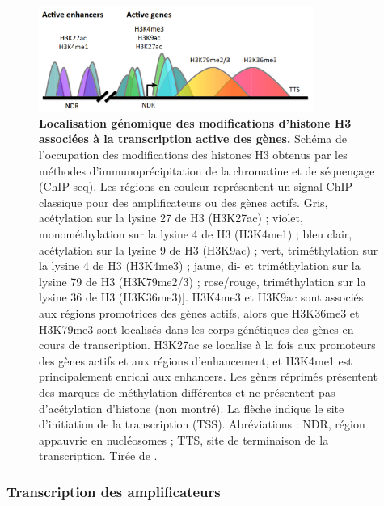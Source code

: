 \begin{figure}[h]
    \centering
    \includegraphics[width=0.8\textwidth, page=1] {figures/introduction/fig9.png}
    \caption[Localisation génomique des modifications d'histone H3 associées à la transcription active des gènes.]{
    \textbf{Localisation génomique des modifications d'histone H3 associées à la transcription active des gènes.}
    Schéma de l'occupation des modifications des histones H3 obtenus par les méthodes d'immunoprécipitation de la chromatine et de séquençage (\acrshort{ChIP-seq}). Les régions en couleur représentent un signal ChIP classique pour des \glspl{amplificateur} ou des gènes actifs.
    Gris, acétylation sur la lysine 27 de H3 (H3K27ac) ; violet, monométhylation sur la lysine 4 de H3 (H3K4me1) ; bleu clair, acétylation sur la lysine 9 de H3 (H3K9ac) ; vert, triméthylation sur la lysine 4 de H3 (H3K4me3) ; jaune, di- et triméthylation sur la lysine 79 de H3 (H3K79me2/3) ; rose/rouge, triméthylation sur la lysine 36 de H3 (H3K36me3)]. H3K4me3 et H3K9ac sont associés aux régions promotrices des gènes actifs, alors que H3K36me3 et H3K79me3 sont localisés dans les corps génétiques des gènes en cours de transcription. H3K27ac se localise à la fois aux promoteurs des gènes actifs et aux régions d'enhancement, et H3K4me1 est principalement enrichi aux enhancers.
    Les gènes réprimés présentent des marques de méthylation différentes et ne présentent pas d'acétylation d'histone (non montré). La flèche indique le site d'initiation de la transcription (\acrshort{TSS}). Abréviations : NDR, région appauvrie en nucléosomes ; TTS, site de terminaison de la transcription. Tirée de \citep{bernstein_genomic_2005}.\\
    }
    \label{fig:Fig9}
\end{figure}

\subsubsection{Transcription des \glspl{amplificateur}}
\label{subsubsec:eRNA}

